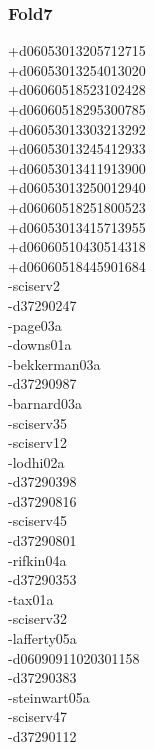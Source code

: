 \begin{multicols}{3}
\subsubsection*{Fold7}
+d06053013205712715\\
+d06053013254013020\\
+d06060518523102428\\
+d06060518295300785\\
+d06053013303213292\\
+d06053013245412933\\
+d06053013411913900\\
+d06053013250012940\\
+d06060518251800523\\
+d06053013415713955\\
+d06060510430514318\\
+d06060518445901684\\
-sciserv2\\
-d37290247\\
-page03a\\
-downs01a\\
-bekkerman03a\\
-d37290987\\
-barnard03a\\
-sciserv35\\
-sciserv12\\
-lodhi02a\\
-d37290398\\
-d37290816\\
-sciserv45\\
-d37290801\\
-rifkin04a\\
-d37290353\\
-tax01a\\
-sciserv32\\
-lafferty05a\\
-d06090911020301158\\
-d37290383\\
-steinwart05a\\
-sciserv47\\
-d37290112\\

\end{multicols}

